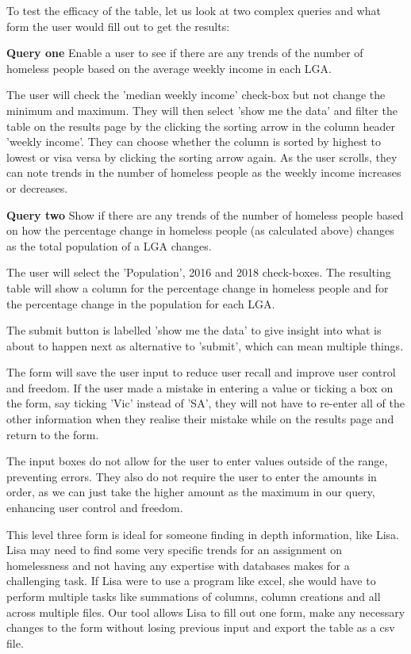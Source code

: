 \documentclass[12pt, a4paper]{article}
\begin{document}
To test the efficacy of the table, let us look at two complex queries and what form the user would fill out to get the results: 

\textbf{Query one} Enable a user to see if there are any trends of the number of homeless people based on the average weekly income in each LGA. 

The user will check the 'median weekly income' check-box but not change the minimum and maximum. They will then select 'show me the data' and filter the table on the results page by the clicking the sorting arrow in the column header 'weekly income'. They can choose whether the column is sorted by highest to lowest or visa versa by clicking the sorting arrow again. As the user scrolls, they can note trends in the number of homeless people as the weekly income increases or decreases. 

\textbf{Query two} Show if there are any trends of the number of homeless people based on how the percentage change in homeless people (as calculated above) changes as the total population of a LGA changes. 

The user will select the 'Population', 2016 and 2018 check-boxes. The resulting table will show a column for the percentage change in homeless people and for the percentage change in the population for each LGA.

The submit button is labelled 'show me the data' to give insight into what is about to happen next as alternative to 'submit', which can mean multiple things.

The form will save the user input to reduce user recall and improve user control and freedom. If the user made a mistake in entering a value or ticking a box on the form, say ticking 'Vic' instead of 'SA', they will not have to re-enter all of the other information when they realise their mistake while on the results page and return to the form. 

The input boxes do not allow for the user to enter values outside of the range, preventing errors. They also do not require the user to enter the amounts in order, as we can just take the higher amount as the maximum in our query, enhancing user control and freedom.

This level three form is ideal for someone finding in depth information, like Lisa. Lisa may need to find some very specific trends for an assignment on homelessness and not having any expertise with databases makes for a challenging task. If Lisa were to use a program like excel, she would have to perform multiple tasks like summations of columns, column creations and all across multiple files. Our tool allows Lisa to fill out one form, make any necessary changes to the form without losing previous input and export the table as a csv file.
\end{document}

